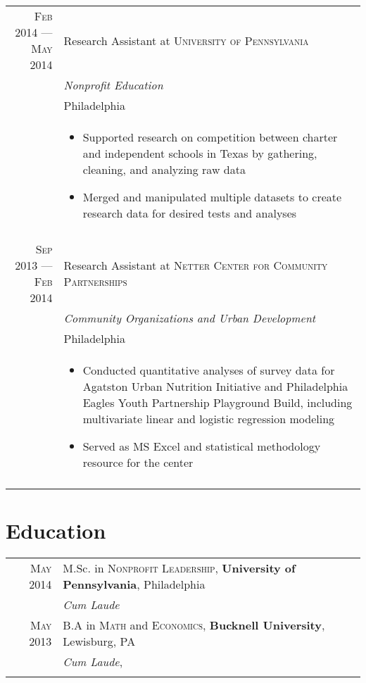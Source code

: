 \documentclass[a4paper,10pt]{article}
\begin{document}
\begin{tabular}{r|p{11cm}}
\textsc{Feb 2014 --- May 2014} & Research Assistant at \textsc{University of Pennsylvania}\\
&\emph{Nonprofit Education}\\
&Philadelphia\\
&\footnotesize{\begin{itemize}
		\item{Supported research on competition between charter and independent schools in Texas by gathering, cleaning, and analyzing raw data}
		\item{Merged and manipulated multiple datasets to create research data for desired tests and analyses}
	\end{itemize}}\\\multicolumn{2}{c}{} \\	
	
 \textsc{Sep 2013 --- Feb 2014} & Research Assistant at \textsc{Netter Center for Community Partnerships}\\
 &\emph{Community Organizations and Urban Development}\\
 &Philadelphia\\
 &\footnotesize{\begin{itemize}
 		\item{Conducted quantitative analyses of survey data for Agatston Urban Nutrition Initiative and Philadelphia Eagles Youth Partnership Playground Build, including multivariate linear and logistic  regression modeling}
 		\item{Served as MS Excel and statistical methodology resource for the center}
 	\end{itemize}}\\\multicolumn{2}{c}{} \\	
\end{tabular}
\newpage
\section{Education}
\begin{tabular}{rl}	
 \textsc{May} 2014 & M.Sc. in \textsc{Nonprofit Leadership}, \textbf{University of Pennsylvania}, Philadelphia\\
& \small\emph{Cum Laude} \\
\textsc{May} 2013& B.A in \textsc{Math} and \textsc{Economics}, \normalsize\textbf{Bucknell University}, Lewisburg, PA \\& \small\emph{Cum Laude}, \\\\
\end{tabular}
\end{document}
